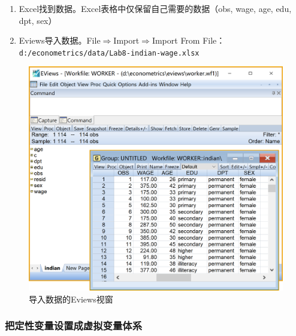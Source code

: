 \documentclass[12pt,(landscape,a4paper),(portrait,a4paper)]{article}
\providecommand{\tightlist}{%
  \setlength{\itemsep}{0pt}\setlength{\parskip}{0pt}}
\theoremstyle{definition}
\theoremstyle{definition}
\theoremstyle{definition}
\theoremstyle{remark}
\begin{document}
\begin{itemize}
\begin{itemize}
    \begin{enumerate}
    \def\labelenumi{\alph{enumi}.}
    \tightlist
    \item
      Excel找到数据。Excel表格中仅保留自己需要的数据（obs, wage, age,
      edu, dpt, sex）
    \item
      Eviews导入数据。File\(\Rightarrow\)Import\(\Rightarrow\)Import
      From File：\texttt{d:/econometrics/data/Lab8-indian-wage.xlsx}
    \end{enumerate}
  \end{itemize}
\end{itemize}

\begin{figure}

{\centering \includegraphics[width=23.33in]{picture/lab8-dummy-model/1-load-worker} 

}

\caption{导入数据的Eviews视窗}\label{fig:fig-load-worker}
\end{figure}

\subsubsection{把定性变量设置成虚拟变量体系}
\end{document}
